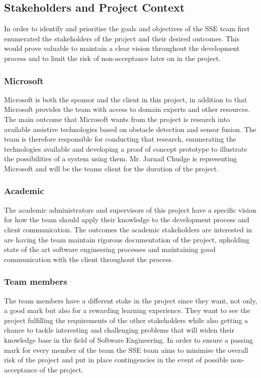\documentclass[prodmode,acmtosem]{acmsmall} %
\begin{document}
\subsection{Stakeholders and Project Context}
In order to identify and prioritise the goals and objectives of the SSE team first enumerated the stakeholders of the project and their desired outcomes. This would prove valuable to maintain a clear vision throughout the development process and to limit the risk of non-acceptance later on in the project.

\subsubsection{Microsoft}
Microsoft is both the sponsor and the client in this project, in addition to that Microsoft provides the team with access to domain experts and other resources. The main outcome that Microsoft wants from the project is research into available assistive technologies based on obstacle detection and sensor fusion. The team is therefore responsible for conducting that research, enumerating the technologies available and developing a proof of concept prototype to illustrate the possibilities of a system using them.
Mr. Jarnail Chudge is representing Microsoft and will be the teams client for the duration of the project.

\subsubsection{Academic}
The academic administrators and supervisors of this project have a specific vision for how the team should apply their knowledge to the development process and client communication.
The outcomes the academic stakeholders are interested in are having the team maintain rigorous documentation of the project, upholding state of the art software engineering processes and maintaining good communication with the client throughout the process.

\subsubsection{Team members}
The team members have a different stake in the project since they want, not only, a good mark but also for a rewarding learning experience.
They want to see the project fulfilling the requirements of the other stakeholders while also getting a chance to tackle interesting and challenging problems that will widen their knowledge base in the field of Software Engineering.
In order to ensure a passing mark for every member of the team the SSE team aims to minimise the overall risk of the project and put in place contingencies in the event of possible non-acceptance of the project.
\end{document}
